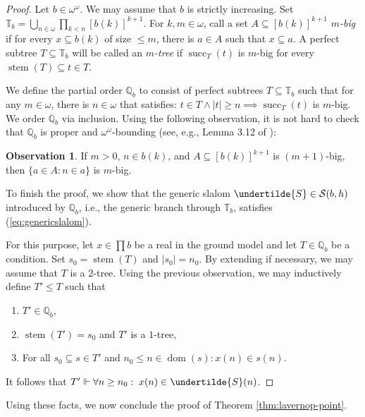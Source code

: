 \documentclass[12pt]{article}
\theoremstyle{definition}
\newtheorem*{obs}{\sc Observation}
\begin{document}
\begin{proof}
Let $b\in\omega^\omega$. We may assume that $b$ is strictly increasing. Set $\mathbb{T}_b=\bigcup_{n\in\omega}\prod_{k<n} [b(k)]^{k+1}$. For $k,m\in\omega$, call a set $A\subseteq [b(k)]^{k+1}$ \emph{$m$-big} if for every $x\subseteq b(k)$ of size $\leq m$, there is $a\in A$ such that $x\subseteq a$. A perfect subtree $T\subseteq \mathbb{T}_b$ will be called an \emph{$m$-tree} if $\operatorname{succ}_T(t)$ is $m$-big for every $\operatorname{stem}(T)\subseteq t\in  T$.

We define the partial order $\mathbb{Q}_b$ to consist of perfect subtrees $T\subseteq \mathbb{T}_b$ such that for any $m\in\omega$, there is $n\in\omega$ that satisfies: $t\in T \land |t|\geq n\implies \operatorname{succ}_T(t)$ is $m$-big. We order $\mathbb{Q}_b$ via inclusion. Using the following observation, it is not hard to check that $\mathbb{Q}_b$ is proper and $\omega^\omega$-bounding (see, e.g., Lemma 3.12 of \cite{abraham2009proper}):
\begin{obs}
If $m>0$, $n\in b(k)$, and $A\subseteq [b(k)]^{k+1}$ is $(m+1)$-big, then $\{a\in A : n\in a\}$ is $m$-big.
\end{obs}
To finish the proof, we show that the generic slalom $\undertilde{S}\in\mathcal{S}(b,h)$ introduced by $\mathbb{Q}_b$, i.e., the generic branch through $\mathbb{T}_b$, satisfies (\ref{eq:genericslalom}).

For this purpose, let $x\in \prod b$ be a real in the ground model and let $T\in\mathbb{Q}_b$ be a condition. Set $s_0=\operatorname{stem}(T)$ and $|s_0|=n_0$. By extending if necessary, we may assume that $T$ is a $2$-tree. Using the previous observation, we may inductively define $T'\leq T$ such that
\begin{enumerate}[label=(\roman*)]
    \item $T'\in \mathbb{Q}_b$,
    \item $\operatorname{stem}(T')=s_0$ and $T'$ is a $1$-tree,
    \item For all $s_0\subseteq s\in T'$ and $n_0\leq n\in\operatorname{dom}(s): x(n)\in s(n)$.
\end{enumerate}
It follows that $T'\Vdash \forall n\geq n_0 :\; x(n)\in \undertilde{S}(n)$.
\end{proof}
Using these facts, we now conclude the proof of Theorem \ref{thm:lavernop-point}.
\end{document}
